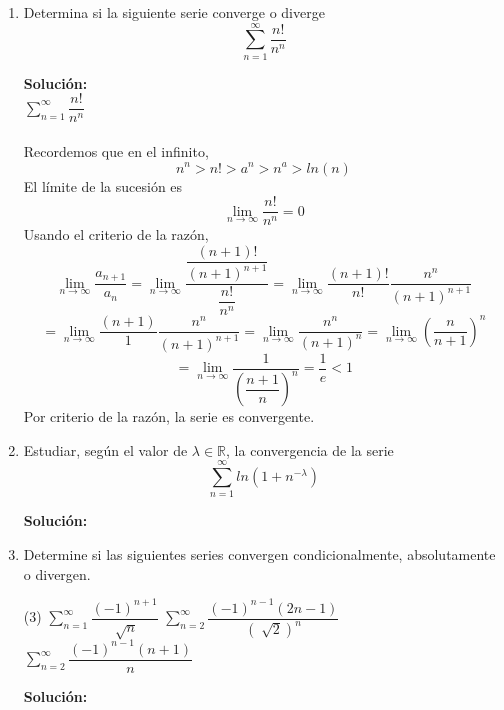 \documentclass[12pt]{article}
\newenvironment{solucion}
{\begin{mdframed}[backgroundcolor=black!10]
		{\bf Solución:}\\
	}
	{
	\end{mdframed}
}
\newenvironment{preguntas}
{\begin{enumerate}\itemsep12pt
	}
	{
	\end{enumerate}
}
\newcommand{\ra}{\rightarrow}
\newcommand{\R}{\mathbb{R}}
\begin{document}
\begin{preguntas}
\item Determina si la siguiente serie converge o diverge
$$\sum\limits_{n=1}^{\infty}\dfrac{n!}{n^n}$$
\begin{solucion}
$\sum\limits_{n=1}^{\infty}\dfrac{n!}{n^n}$\\
			\\
			Recordemos que en el infinito,
			$$n^n > n! > a^n > n^a > ln(n)$$
			El límite de la sucesión es
			$$\lim\limits_{n\ra\infty}\dfrac{n!}{n^n} = 0$$
			Usando el criterio de la razón,
			$$\lim\limits_{n \ra \infty} \dfrac{a_{n+1}}{a_n}
			= \lim\limits_{n \ra \infty} \dfrac{\dfrac{(n+1)!}{(n+1)^{n+1}}}{\dfrac{n!}{n^n}}
			= \lim\limits_{n \ra \infty} \dfrac{(n+1)!}{n!}\dfrac{n^n}{(n+1)^{n+1}}$$
			$$= \lim\limits_{n \ra \infty} \dfrac{(n+1)}{1}\dfrac{n^n}{(n+1)^{n+1}}
			= \lim\limits_{n \ra \infty} \dfrac{n^n}{(n+1)^{n}}
			= \lim\limits_{n \ra \infty} \left(\dfrac{n}{n+1}\right)^n$$
			$$= \lim\limits_{n \ra \infty} \dfrac{1}{\left(\dfrac{n+1}{n}\right)^n}
			= \dfrac{1}{e} < 1$$
			Por criterio de la razón, la serie es convergente.
\end{solucion}
\item Estudiar, según el valor de $\lambda \in \R$, la convergencia de la serie
	$$\sum\limits_{n=1}^{\infty}ln(1+n^{-\lambda})$$
\begin{solucion}

\end{solucion}
\item Determine si las siguientes series convergen condicionalmente, absolutamente o divergen.
\begin{tasks}(3)
\task $\sum\limits_{n=1}^{\infty}\dfrac{(-1)^{n+1}}{\sqrt[]{n}}$
\task $\sum\limits_{n=2}^{\infty}\dfrac{(-1)^{n-1}(2n-1)}{(\sqrt[]{2})^n}$
\task $\sum\limits_{n=2}^{\infty}\dfrac{(-1)^{n-1}(n+1)}{n}$
\end{tasks}
\begin{solucion}


\end{solucion}
\end{preguntas}
\end{document}
